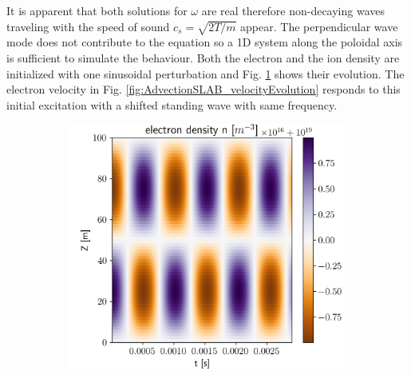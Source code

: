 It is apparent that both solutions for $\omega$ are real therefore non-decaying waves traveling with the speed of sound $c_s = \sqrt{2T/m}$ appear. The perpendicular wave mode does not contribute to the equation so a 1D system along the poloidal axis is sufficient to simulate the behaviour. Both the electron and the ion density are initialized with one sinusoidal perturbation and Fig. \ref{fig:AdvectionSLAB_densityEvolution} shows their evolution. The electron velocity in Fig. \ref{fig:AdvectionSLAB_velocityEvolution} responds to this initial excitation with a shifted standing wave with same frequency. 

\begin{figure}[H]
	\centering
	\begin{subfigure}[b]{0.32\textwidth}
		\centering
		\includegraphics[width=1\textwidth]{schemes/AdvectionSLAB_1D_timeplot_ne.png}
		\label{fig:AdvectionSLAB_densityEvolution}
	\end{subfigure}
	\begin{subfigure}[b]{0.32\textwidth}
		\centering

\end{subfigure}
\end{figure}
